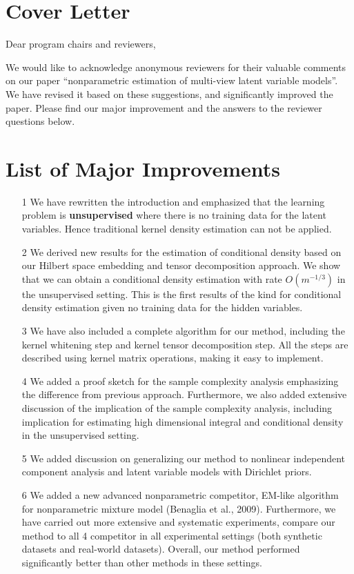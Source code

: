 \documentclass{article}
\begin{document}
\section*{Cover Letter}

Dear program chairs and reviewers,

We would like to acknowledge anonymous reviewers for their valuable comments on our paper ``nonparametric estimation of multi-view latent variable models''. We have revised it based on these suggestions, and significantly improved the paper. Please find our major improvement and the answers to the reviewer questions below.

\section*{List of Major Improvements}

\begin{itemize}
\item[1] We have rewritten the introduction and emphasized that the learning problem is {\bf unsupervised} where there is no training data for the latent variables. Hence traditional kernel density estimation can not be applied.

\item[2] We derived new results for the estimation of conditional density based on our Hilbert space embedding and tensor decomposition approach. We show that we can obtain a conditional density estimation with rate $O(m^{-1/3})$ in the unsupervised setting. This is the first results of the kind for conditional density estimation given no training data for the hidden variables.

\item[3] We have also included a complete algorithm for our method, including the kernel whitening step and kernel tensor decomposition step. All the steps are described using kernel matrix operations, making it easy to implement.

\item[4] We added a proof sketch for the sample complexity analysis emphasizing the difference from previous approach. Furthermore, we also added extensive discussion of the implication of the sample complexity analysis, including implication for estimating high dimensional integral and conditional density in the unsupervised setting.

\item[5] We added discussion on generalizing our method to nonlinear independent component analysis and latent variable models with Dirichlet priors.

\item[6] We added a new advanced nonparametric competitor, EM-like algorithm for nonparametric mixture model (Benaglia et al., 2009). Furthermore, we have carried out more extensive and systematic experiments, compare our method to all 4 competitor in all experimental settings (both synthetic datasets and real-world datasets). Overall, our method performed significantly better than other methods in these settings.

\end{itemize}
\end{document}
